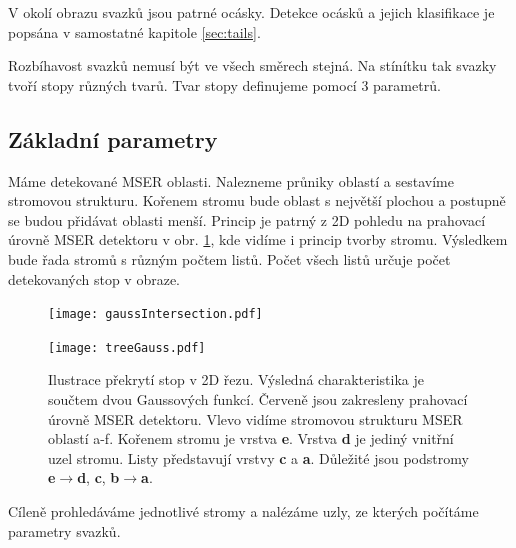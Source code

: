 V okolí obrazu svazků jsou patrné ocásky. Detekce ocásků a jejich klasifikace je popsána v samostatné kapitole \ref{sec:tails}.

Rozbíhavost svazků nemusí být ve všech směrech stejná. Na stínítku tak svazky tvoří stopy různých tvarů. Tvar stopy definujeme pomocí 3 parametrů.

\subsection{Základní parametry}

Máme detekované MSER oblasti. Nalezneme průniky oblastí a sestavíme stromovou strukturu. Kořenem stromu bude oblast s největší plochou a postupně se budou přidávat oblasti menší. Princip je patrný z 2D pohledu na prahovací úrovně MSER detektoru v obr. \ref{fig:gaussIntersection}, kde vidíme i princip tvorby stromu. Výsledkem bude řada stromů s různým počtem listů. Počet všech listů určuje počet detekovaných stop v obraze.

\begin{figure}[htbp]
    \centering
	\begin{minipage}[c]{0.78 \textwidth}
    \texttt{[image: gaussIntersection.pdf]}
    \end{minipage}
    \begin{minipage}[c]{0.16 \textwidth}
    \texttt{[image: treeGauss.pdf]}
    \end{minipage}
    
    
     \caption[]{Ilustrace překrytí stop v 2D řezu. Výsledná charakteristika je součtem dvou Gaussových funkcí. Červeně jsou zakresleny prahovací úrovně MSER detektoru. Vlevo vidíme stromovou strukturu MSER oblastí a-f. Kořenem stromu je vrstva \textbf{e}. Vrstva \textbf{d} je jediný vnitřní uzel stromu. Listy představují vrstvy \textbf{c} a \textbf{a}. Důležité jsou podstromy \textbf{e}$\rightarrow$\textbf{d}, \textbf{c}, \textbf{b}$\rightarrow$\textbf{a}.}
        \label{fig:gaussIntersection}
\end{figure}

Cíleně prohledáváme jednotlivé stromy a nalézáme uzly, ze kterých počítáme parametry svazků.

